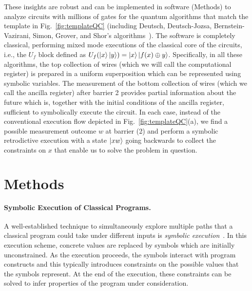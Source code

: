 \documentclass[sigplan]{acmart}
\begin{document}
These insights are robust and can be implemented in software (Methods)
to analyze circuits with millions of gates for the quantum algorithms
that match the template in Fig.~\ref{fig:templateQC} (including
Deutsch, Deutsch-Jozsa, Bernstein-Vazirani, Simon, Grover, and Shor's
algorithms~\cite{doi:10.1137/S0097539796300921,deutsch,deutschJozsa,365701,doi:10.1137/S0097539795293172,nielsen_chuang_2010,10.1145/237814.237866}). The
software is completely classical, performing mixed mode executions of
the classical core of the circuits, i.e., the $U_f$ block defined as
$U_f(\ket{x}\ket{y}) = \ket{x}\ket{f(x) \oplus y}$. Specifically, in
all these algorithms, the top collection of wires (which we will call
the computational register) is prepared in a uniform superposition
which can be represented using symbolic variables. The measurement of
the bottom collection of wires (which we call the ancilla register)
after barrier 2 provides partial information about the future which
is, together with the initial conditions of the ancilla register,
sufficient to symbolically execute the circuit. In each case, instead
of the conventional execution flow depicted in
Fig.~\ref{fig:templateQC}(a), we find a possible measurement outcome
$w$ at barrier (2) and perform a symbolic retrodictive execution with
a state $\ket{xw}$ going backwards to collect the constraints on $x$
that enable us to solve the problem in question.

\section*{Methods}

\paragraph*{Symbolic Execution of Classical Programs.}
A well-established technique to simultaneously explore multiple paths
that a classical program could take under different inputs is
\emph{symbolic
  execution}~\cite{10.1145/390016.808445,10.1145/360248.360252,howden,10.1145/800191.805647,10.1145/3182657}. In
this execution scheme, concrete values are replaced by symbols which are
initially unconstrained. As the execution proceeds, the symbols
interact with program constructs and this typically introduces
constraints on the possible values that the symbols represent. At the
end of the execution, these constraints can be solved to infer
properties of the program under consideration. 
\end{document}
